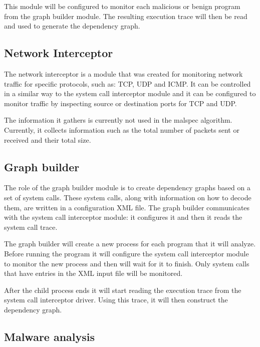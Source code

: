 This module will be configured to monitor each malicious or benign program from the graph builder module. The resulting execution trace will then be read and used to generate the dependency graph.

\subsection{Network Interceptor}

The network interceptor is a module that was created for monitoring network traffic for specific protocols, such as: TCP, UDP and ICMP. It can be controlled in a similar way to the system call interceptor module and it can be configured to monitor traffic by inspecting source or destination ports for TCP and UDP.

The information it gathers is currently not used in the malspec algorithm. Currently, it collects information such as the total number of packets sent or received and their total size.

  

\subsection{Graph builder}

The role of the graph builder module is to create dependency graphs based on a set of system calls. These system calls, along with information on how to decode them, are written in a configuration XML file. The graph builder communicates with the system call interceptor module: it configures it and then it reads the system call trace.

The graph builder will create a new process for each program that it will analyze. Before running the program it will configure the system call interceptor module to monitor the new process and then will wait for it to finish. Only system calls that have entries in the XML input file will be monitored.

After the child process ends it will start reading the execution trace from the system call interceptor driver. Using this trace, it will then construct the dependency graph.

\subsection{Malware analysis}
 
